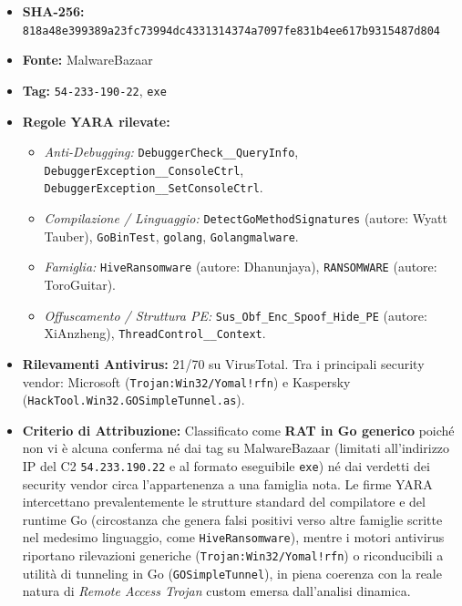 \documentclass[11pt, a4paper]{article}
\begin{document}
\begin{itemize}
	\item \textbf{SHA-256:} {\small\texttt{818a48e399389a23fc73994dc4331314374a7097fe831b4ee617b9315487d804}}
	\item \textbf{Fonte:} MalwareBazaar
	\item \textbf{Tag:} \texttt{54-\allowbreak{}233-\allowbreak{}190-\allowbreak{}22}, \texttt{exe}
	\item \textbf{Regole YARA rilevate:}
	\begin{itemize}
		\item \textit{Anti-Debugging:} \texttt{Debugger\allowbreak{}Check\_\_\allowbreak{}Query\allowbreak{}Info}, \texttt{Debugger\allowbreak{}Exception\_\_\allowbreak{}Console\allowbreak{}Ctrl}, \texttt{Debugger\allowbreak{}Exception\_\_\allowbreak{}Set\allowbreak{}Console\allowbreak{}Ctrl}.
		\item \textit{Compilazione / Linguaggio:} \texttt{Detect\allowbreak{}Go\allowbreak{}Method\allowbreak{}Signatures} (autore: Wyatt Tauber), \texttt{GoBinTest}, \texttt{golang}, \texttt{Golangmalware}.
		\item \textit{Famiglia:} \texttt{Hive\allowbreak{}Ransomware} (autore: Dhanunjaya), \texttt{RANSOMWARE} (autore: ToroGuitar).
		\item \textit{Offuscamento / Struttura PE:} \texttt{Sus\_\allowbreak{}Obf\_\allowbreak{}Enc\_\allowbreak{}Spoof\_\allowbreak{}Hide\_\allowbreak{}PE} (autore: XiAnzheng), \texttt{Thread\allowbreak{}Control\_\_\allowbreak{}Context}.
	\end{itemize}
	\item \textbf{Rilevamenti Antivirus:} 21/70 su VirusTotal. Tra i principali security vendor: Microsoft (\texttt{Trojan:Win32/\allowbreak{}Yomal!rfn}) e Kaspersky (\texttt{Hack\allowbreak{}Tool.\allowbreak{}Win32.\allowbreak{}GO\allowbreak{}Simple\allowbreak{}Tunnel.\allowbreak{}as}).
	\item \textbf{Criterio di Attribuzione:} Classificato come \textbf{RAT in Go generico} poich\'e non vi \`e alcuna conferma n\'e dai tag su MalwareBazaar (limitati all'indirizzo IP del C2 \texttt{54.233.190.22} e al formato eseguibile \texttt{exe}) n\'e dai verdetti dei security vendor circa l'appartenenza a una famiglia nota. Le firme YARA intercettano prevalentemente le strutture standard del compilatore e del runtime Go (circostanza che genera falsi positivi verso altre famiglie scritte nel medesimo linguaggio, come \texttt{Hive\allowbreak{}Ransomware}), mentre i motori antivirus riportano rilevazioni generiche (\texttt{Trojan:Win32/\allowbreak{}Yomal!rfn}) o riconducibili a utilit\`a di tunneling in Go (\texttt{GO\allowbreak{}Simple\allowbreak{}Tunnel}), in piena coerenza con la reale natura di \textit{Remote Access Trojan} custom emersa dall'analisi dinamica.
\end{itemize}
\end{document}
